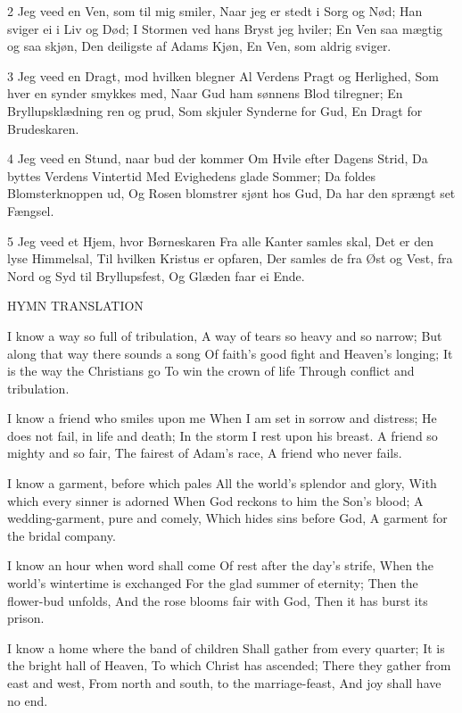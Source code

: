 2 Jeg veed en Ven, som til mig smiler,
Naar jeg er stedt i Sorg og Nød;
Han sviger ei i Liv og Død;
I Stormen ved hans Bryst jeg hviler;
En Ven saa mægtig og saa skjøn,
Den deiligste af Adams Kjøn,
En Ven, som aldrig sviger.

3 Jeg veed en Dragt, mod hvilken blegner
Al Verdens Pragt og Herlighed,
Som hver en synder smykkes med,
Naar Gud ham sønnens Blod tilregner;
En Bryllupsklædning ren og prud,
Som skjuler Synderne for Gud,
En Dragt for Brudeskaren.


4 Jeg veed en Stund, naar bud der kommer
Om Hvile efter Dagens Strid,
Da byttes Verdens Vintertid
Med Evighedens glade Sommer;
Da foldes Blomsterknoppen ud,
Og Rosen blomstrer sjønt hos Gud,
Da har den sprængt set Fængsel.

5 Jeg veed et Hjem, hvor Børneskaren
Fra alle Kanter samles skal,
Det er den lyse Himmelsal,
Til hvilken Kristus er opfaren,
Der samles de fra Øst og Vest,
fra Nord og Syd til Bryllupsfest,
Og Glæden faar ei Ende.


HYMN TRANSLATION

I know a way so full of tribulation, 
A way of tears so heavy and so narrow; But along that way there sounds a song Of faith’s good fight and Heaven’s longing; It is the way the Christians go To win the crown of life Through conflict and tribulation.

I know a friend who smiles upon me
When I am set in sorrow and distress; He does not fail, in life and death; In the storm I rest upon his breast. A friend so mighty and so fair, The fairest of Adam’s race, A friend who never fails.

I know a garment, before which pales All the world’s splendor and glory, With which every sinner is adorned When God reckons to him the Son’s blood; A wedding-garment, pure and comely, Which hides sins before God, A garment for the bridal company.

I know an hour when word shall come 
Of rest after the day’s strife, When the world’s wintertime is exchanged For the glad summer of eternity; Then the flower-bud unfolds, And the rose blooms fair with God, Then it has burst its prison.

I know a home where the band of children 
Shall gather from every quarter; It is the bright hall of Heaven, To which Christ has ascended; There they gather from east and west, From north and south, to the marriage-feast, And joy shall have no end.